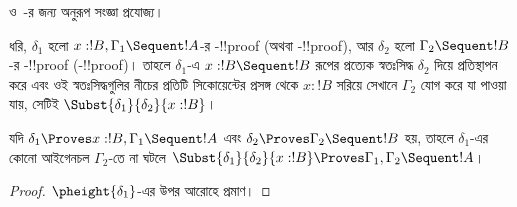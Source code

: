 \documentclass[../../../include/open-logic-section]{subfiles}
\begin{document}
 ও~-র জন্য অনুরূপ সংজ্ঞা প্রযোজ্য।

\begin{defn}
ধরি, $\delta_1$ হলো $x:!B, \Gamma_1 \Sequent !A$-র
-!!{proof} (অথবা -!!{proof}), আর
$\delta_2$ হলো $\Gamma_2 \Sequent !B$-র
-!!{proof} (-!!{proof})। তাহলে
$\delta_1$-এ $x:!B \Sequent !B$ রূপের প্রত্যেক স্বতঃসিদ্ধ
$\delta_2$ দিয়ে প্রতিস্থাপন করে এবং ওই স্বতঃসিদ্ধগুলির
নীচের প্রতিটি সিকোয়েন্টের প্রসঙ্গ থেকে $x:!B$ সরিয়ে সেখানে
$\Gamma_2$ যোগ করে
যা পাওয়া যায়, সেটিই $\Subst{\delta_1}{\delta_2}{x:!B}$।
\end{defn}

\begin{prop}
যদি $\delta_1 \Proves x:!B, \Gamma_1 \Sequent
!A$ এবং $\delta_2 \Proves \Gamma_2 \Sequent !B$ হয়,
তাহলে $\delta_1$-এর কোনো আইগেনচল $\Gamma_2$-তে না
ঘটলে $\Subst{\delta_1}{\delta_2}{x:!B} \Proves \Gamma_1, \Gamma_2 \Sequent
!A$।
\end{prop}

\begin{proof}
  $\pheight{\delta_1}$-এর উপর আরোহে প্রমাণ।
\end{proof}
\end{document}
